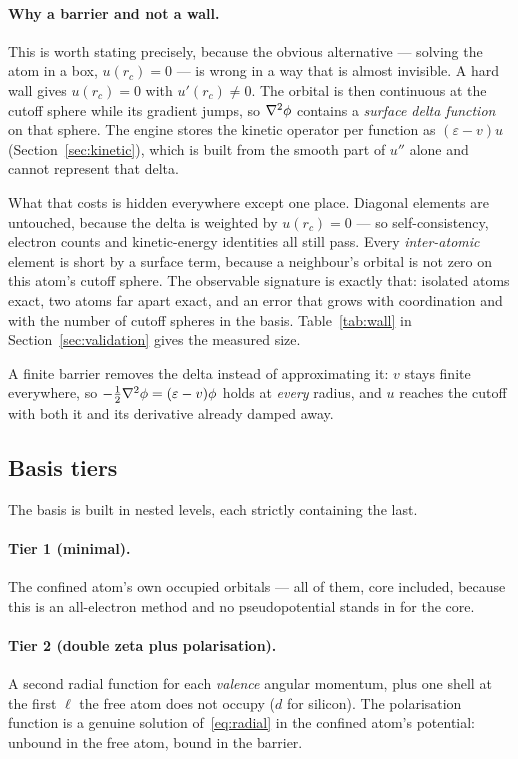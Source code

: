 \documentclass[11pt,a4paper]{article}
\begin{document}
\paragraph{Why a barrier and not a wall.}
This is worth stating precisely, because the obvious alternative --- solving
the atom in a box, $u(r_c) = 0$ --- is wrong in a way that is almost
invisible. A hard wall gives $u(r_c) = 0$ with $u'(r_c) \neq 0$. The orbital
is then continuous at the cutoff sphere while its gradient jumps, so
$\laplacian\phi$ contains a \emph{surface delta function} on that sphere. The
engine stores the kinetic operator per function as
$(\varepsilon - v)u$ (Section~\ref{sec:kinetic}), which is built from the
smooth part of $u''$ alone and cannot represent that delta.

What that costs is hidden everywhere except one place. Diagonal elements are
untouched, because the delta is weighted by $u(r_c) = 0$ --- so
self-consistency, electron counts and kinetic-energy identities all still
pass. Every \emph{inter-atomic} element is short by a surface term, because a
neighbour's orbital is not zero on this atom's cutoff sphere. The observable
signature is exactly that: isolated atoms exact, two atoms far apart exact,
and an error that grows with coordination and with the number of cutoff
spheres in the basis. Table~\ref{tab:wall} in Section~\ref{sec:validation}
gives the measured size.

A finite barrier removes the delta instead of approximating it: $v$ stays
finite everywhere, so $-\tfrac12\laplacian\phi = (\varepsilon - v)\phi$ holds
at \emph{every} radius, and $u$ reaches the cutoff with both it and its
derivative already damped away.

\subsection{Basis tiers}
\label{sec:tiers}

The basis is built in nested levels, each strictly containing the last.

\paragraph{Tier 1 (minimal).} The confined atom's own occupied orbitals ---
all of them, core included, because this is an all-electron method and no
pseudopotential stands in for the core.

\paragraph{Tier 2 (double zeta plus polarisation).} A second radial function
for each \emph{valence} angular momentum, plus one shell at the first $\ell$
the free atom does not occupy ($d$ for silicon). The polarisation function is
a genuine solution of~\eqref{eq:radial} in the confined atom's potential:
unbound in the free atom, bound in the barrier.
\end{document}
